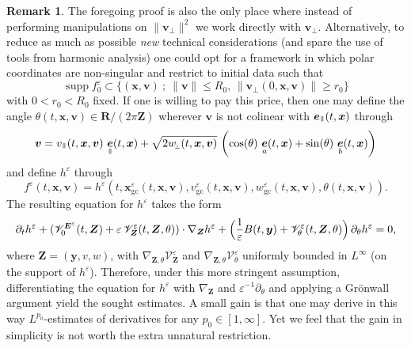 \documentclass[10pt]{amsart}
\let\mathcal\mathscr
\newcommand{\sperp}{{\scriptscriptstyle\perp}}
\newcommand{\sep}{\ ;\ }
\let\eps\varepsilon
\let\d\partial
\theoremstyle{plain}
\theoremstyle{definition}
\newtheorem{remark}[theorem]{Remark}
\newcommand\br{\begin{remark}}
\newcommand\er{\end{remark}}
\newcommand{\be}{\begin{equation}}
\newcommand{\ee}{\end{equation}}
\newcommand\R{\mathbf R}
\newcommand{\Z}{\mathbf Z}
\newcommand\bE{{\boldsymbol E}}
\newcommand\bZ{{\boldsymbol Z}}
\newcommand\bfv{{\boldsymbol v}}
\newcommand\bfx{{\boldsymbol x}}
\newcommand\bfy{{\boldsymbol y}}
\newcommand\cV{{\mathcal V}}
\DeclareMathOperator{\beD}{\boldsymbol{e}}
\newcommand\eDpar{\beD_\mypar}
\newcommand\eDa{\beD_a}
\newcommand\eDb{\beD_b}
\newcommand\vpar{v_\mypar}
\newcommand\bvperp{\bfv_{\!\sperp}}
\newcommand\wperp{w_{\!\sperp}}
\newcommand{\GC}{\bfx_\mathrm{gc}}
\newcommand{\eGC}{w_\mathrm{gc}}
\newcommand{\vGC}{v_\mathrm{gc}}
\newcommand{\mypar}{{\mkern3mu\vphantom{\perp}\vrule depth 0pt\mkern2mu\vrule depth 0pt\mkern3mu}}
\begin{document}
\br
The foregoing proof is also the only place where instead of performing manipulations on $\|\bvperp\|^2$ we work directly with $\bvperp$. Alternatively, to reduce as much as possible \emph{new} technical considerations (and spare the use of tools from harmonic analysis) one could opt for a framework in which polar coordinates are non-singular and restrict to initial data such that\enlargethispage{\baselineskip}%
\[
\operatorname{supp}f_0^\eps\subset
\{(\bfx,\bfv)\sep \|\bfv\|\leq R_0,\, \|\bvperp(0,\bfx,\bfv)\|\geq r_0\}
\]
with $0<r_0<R_0$ fixed. If one is willing to pay this price, then one may define the angle $\theta(t,\bfx,\bfv)\in \R/(2\pi\Z)$ wherever $\bfv$ is not colinear with $\eDpar(t,\bfx)$ through
\be
\label{def:theta}
\bfv=\vpar(t,\bfx,\bfv)\,\eDpar(t,\bfx)
+\sqrt{2\wperp(t,\bfx,\bfv)}\,\left(
\cos(\theta)\,\eDa(t,\bfx)
+\sin(\theta)\,\eDb(t,\bfx)\right)
\ee
and define $h^\eps$ through\vspace*{-3pt}
\[
f^\eps(t,\bfx,\bfv)=h^\eps(t,\GC^\eps(t,\bfx,\bfv),\vGC^\eps(t,\bfx,\bfv),\eGC^\eps(t,\bfx,\bfv),\theta(t,\bfx,\bfv)).
\]
The resulting equation for $h^\eps$ takes the form\vspace*{-3pt}
\[
\d_th^\eps+(\cV_0^{\bE^\eps}(t,\bZ)
+\eps\,\cV_\bZ^\eps(t,\bZ,\theta))\cdot\nabla_\bZ h^\eps
+\Bigl(\frac1\eps B(t,\bfy)+\cV_\theta^\eps(t,\bZ,\theta)\Bigr)\,\d_\theta h^\eps=0,
\]
where $\bZ=(\bfy,v,w)$, with $\nabla_{\bZ,\theta}\cV_\bZ^\eps$ and $\nabla_{\bZ,\theta}\cV_\theta^\eps$ uniformly bounded in $L^\infty$ (on the support of $h^\eps$). Therefore, under this more stringent assumption, differentiating the equation for $h^\eps$ with $\nabla_\bZ$ and $\eps^{-1}\d_\theta$ and applying a Grönwall argument yield the sought estimates. A small gain is that one may derive in this way $L^{p_0}$-estimates of derivatives for any $p_0\in[1,\infty]$. Yet we feel that the gain in simplicity is not worth the extra unnatural restriction.
\er
\end{document}
